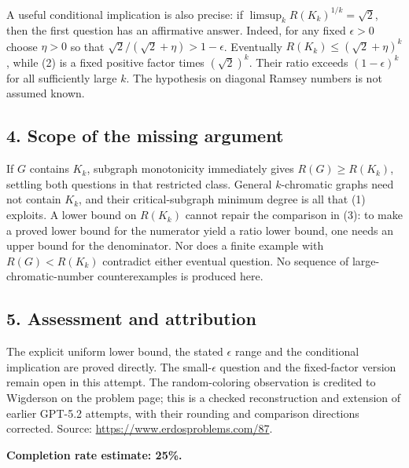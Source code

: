 A useful conditional implication is also precise: if $\limsup_kR(K_k)^{1/k}=\sqrt2$, then the first question has an affirmative answer. Indeed, for any fixed $\epsilon>0$ choose $\eta>0$ so that $\sqrt2/(\sqrt2+\eta)>1-\epsilon$. Eventually $R(K_k)\le(\sqrt2+\eta)^k$, while (2) is a fixed positive factor times $(\sqrt2)^k$. Their ratio exceeds $(1-\epsilon)^k$ for all sufficiently large $k$. The hypothesis on diagonal Ramsey numbers is not assumed known.

\subsection*{4. Scope of the missing argument}
If $G$ contains $K_k$, subgraph monotonicity immediately gives $R(G)\ge R(K_k)$, settling both questions in that restricted class. General $k$-chromatic graphs need not contain $K_k$, and their critical-subgraph minimum degree is all that (1) exploits.
A lower bound on $R(K_k)$ cannot repair the comparison in (3): to make a proved lower bound for the numerator yield a ratio lower bound, one needs an upper bound for the denominator. Nor does a finite example with $R(G)<R(K_k)$ contradict either eventual question. No sequence of large-chromatic-number counterexamples is produced here.

\subsection*{5. Assessment and attribution}
The explicit uniform lower bound, the stated $\epsilon$ range and the conditional implication are proved directly. The small-$\epsilon$ question and the fixed-factor version remain open in this attempt. The random-coloring observation is credited to Wigderson on the problem page; this is a checked reconstruction and extension of earlier GPT-5.2 attempts, with their rounding and comparison directions corrected.
Source: \url{https://www.erdosproblems.com/87}.

\textbf{Completion rate estimate: 25\%.}

